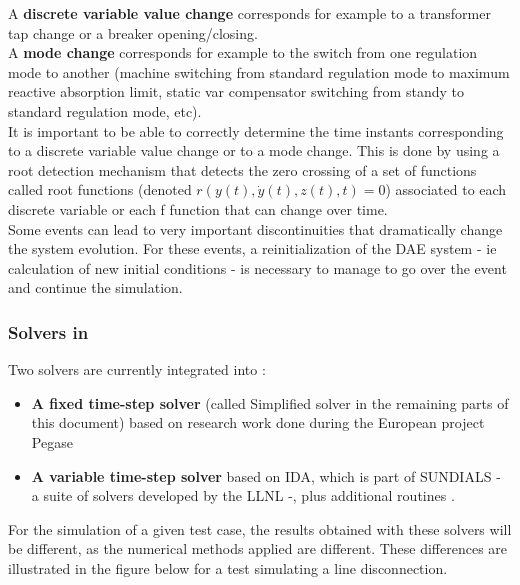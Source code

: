 \documentclass[a4paper, 12pt]{report}
\begin{document}
A \textbf{discrete variable value change} corresponds for example to a transformer tap change or a breaker opening/closing. \\

A \textbf{mode change} corresponds for example to the switch from one regulation mode to another (machine switching from standard regulation mode to maximum reactive absorption limit, static var compensator switching from standy to standard regulation mode, etc). \\

It is important to be able to correctly determine the time instants corresponding to a discrete variable value change or to a mode change. This is done by using a root detection mechanism that detects the zero crossing of a set of functions called root functions (denoted $r(y(t), \dot{y}(t), z(t), t) = 0$) associated to each discrete variable or each f function that can change over time. \\

Some events can lead to very important discontinuities that dramatically change the system evolution. For these events, a reinitialization of the \ac{DAE} system - ie calculation of new initial conditions - is necessary to manage to go over the event and continue the simulation. \\

\subsubsection[Solvers in Dynawo]{Solvers in \Dynawo}

Two solvers are currently integrated into \Dynawo:
\begin{itemize}
\item \textbf{A fixed time-step solver} (called Simplified solver in the remaining parts of this document) based on research work done during the European project Pegase \cite{Pegase_Report, Pegase_Events, Pegase_IEEE_GM}
\item \textbf{A variable time-step solver} based on IDA, which is part of \ac{SUNDIALS} - a suite of solvers developed by the \ac{LLNL} -, plus additional routines \cite{hindmarsh2005sundials}.
\end{itemize}

For the simulation of a given test case, the results obtained with these solvers will be different, as the numerical methods applied are different. These differences are illustrated in the figure below for a test simulating a line disconnection.
\end{document}
